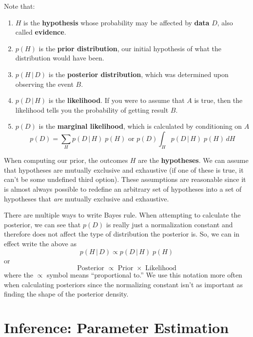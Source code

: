 \documentclass{article}
\begin{document}
    Note that:
    \begin{enumerate}
      \item $H$ is the \textbf{hypothesis} whose probability may be affected by \textbf{data} $D$, also called \textbf{evidence}.
      \item $p(H)$ is the \textbf{prior distribution}, our initial hypothesis of what the distribution would have been.
      \item $p(H\,|\,D)$ is the \textbf{posterior distribution}, which was determined upon observing the event $B$.
      \item $p(D\,|\,H)$ is the \textbf{likelihood}. If you were to assume that $A$ is true, then the likelihood tells you the probability of getting result $B$.
      \item $p(D)$ is the \textbf{marginal likelihood}, which is calculated by conditioning on $A$
      \begin{equation}
        p(D) = \sum_H p(D\,|\,H)\; p(H) \text{ or } p(D) \int_H p(D\,|\,H)\; p(H) \, dH
      \end{equation}
    \end{enumerate}

    When computing our prior, the outcomes $H$ are the \textbf{hypotheses}. We can assume that hypotheses are mutually exclusive and exhaustive (if one of these is true, it can't be some undefined third option). These assumptions are reasonable since it is almost always possible to redefine an arbitrary set of hypotheses into a set of hypotheses that \textit{are} mutually exclusive and exhaustive.

    There are multiple ways to write Bayes rule. When attempting to calculate the posterior, we can see that $p(D)$ is really just a normalization constant and therefore does not affect the type of distribution the posterior is. So, we can in effect write the above as
    \begin{equation}
      p(H\,|\,D) \propto p(D\,|\,H)\; p(H)
    \end{equation}
    or
    \begin{equation}
      \text{Posterior } \propto \text{ Prior } \times \text{ Likelihood}
    \end{equation}
    where the $\propto$ symbol means ``proportional to.'' We use this notation more often when calculating posteriors since the normalizing constant isn't as important as finding the shape of the posterior density.

\section{Inference: Parameter Estimation}
\end{document}
